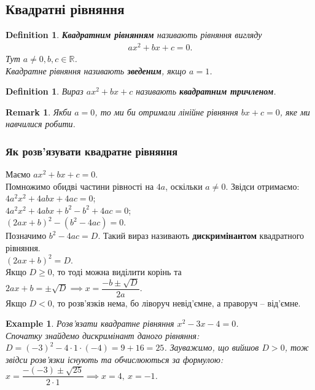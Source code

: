 \documentclass[a4paper, 10pt]{article}
\theoremstyle{theoremdd}
\theoremstyle{theoremdd}
\newtheorem{definition}[theorem]{Definition}
\theoremstyle{theoremdd}
\theoremstyle{theoremdd}
\newtheorem{example}[theorem]{Example}
\theoremstyle{theoremdd}
\theoremstyle{theoremdd}
\newtheorem{remark}[theorem]{Remark}
\theoremstyle{theoremdd}
\theoremstyle{theoremdd}
\begin{document}
\subsection{Квадратні рівняння}
\begin{definition}
\textbf{Квадратним рівнянням} називають рівняння вигляду
\begin{align*}
ax^2 + bx + c = 0.
\end{align*}
Тут $a \neq 0, b,c \in \mathbb{R}$.\\
Квадратне рівняння називають \textbf{зведеним}, якщо $a = 1$.
\end{definition}

\begin{definition}
Вираз $ax^2 + bx+ c$ називають \textbf{квадратним тричленом}.
\end{definition}

\begin{remark}
Якби $a = 0$, то ми би отримали лінійне рівняння $bx + c = 0$, яке ми навчилися робити.
\end{remark}

\subsubsection*{Як розв'язувати квадратне рівняння}
Маємо $ax^2 + bx + c = 0$.\\
Помножимо обидві частини рівності на $4a$, оскільки $a \neq 0$. Звідси отримаємо:\\
$4a^2x^2 + 4abx + 4ac = 0$;\\
$4a^2x^2 + 4abx + b^2 - b^2 + 4ac = 0$;\\
$(2ax+b)^2 - (b^2 - 4ac) = 0$.\\
Позначимо $b^2 - 4ac = D$. Такий вираз називають \textbf{дискримінантом} квадратного рівняння.\\
$(2ax+b)^2 = D$.\\
Якщо $D \geq 0$, то тоді можна виділити корінь та $2ax+b = \pm \sqrt{D} \implies x = \dfrac{-b \pm \sqrt{D}}{2a}$.\\
Якщо $D < 0$, то розв'язків нема, бо ліворуч невід'ємне, а праворуч -- від'ємне.

\begin{example}
Розв'язати квадратне рівняння $x^2 - 3x - 4 = 0$.\\
Спочатку знайдемо дискримінант даного рівняння: $D = (-3)^2 - 4 \cdot 1 \cdot (-4) = 9 + 16 = 25$. Зауважимо, що вийшов $D > 0$, тож звідси розв'язки існують та обчислюються за формулою:\\
$x = \dfrac{-(-3) \pm \sqrt{25}}{2 \cdot 1} \implies x = 4,\ x = -1$.
\end{example}
\end{document}
